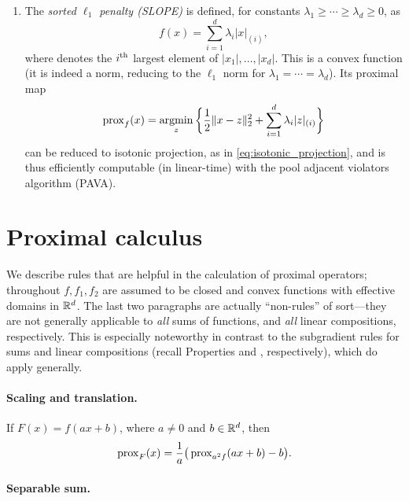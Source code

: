 \begin{Example}
\begin{enumerate}[label=\alph*., ref=\alph*]
\item {}
  The \emph{sorted $\ell_1$ penalty (SLOPE)} is defined, for constants
  $\lambda_1 \geq \cdots \geq \lambda_d \geq 0$, as 
  \begin{equation}
  \label{eq:slope}
  f(x) = \sum_{i=1}^d \lambda_i |x|_{(i)},
  \end{equation}
  where  denotes the $i^{\textnormal{th}}$ largest element of $|x_1|,
  \dots, |x_d|$. This is a convex function (it is indeed a norm, reducing to
  the $\ell_1$ norm for $\lambda_1 = \cdots = \lambda_d$). Its proximal map   
  \[
  \operatorname{prox}_f(x) = \operatorname*{argmin}_z \bigg\{ \frac{1}{2} \|x - z\|_2^2 +
  \sum_{i=1}^d \lambda_i |z|_{(i)} \bigg\}
  \]
  can be reduced to isotonic projection, as in \eqref{eq:isotonic_projection},
  and is thus efficiently computable (in linear-time) with the pool adjacent
  violators algorithm (PAVA). 
\end{enumerate}
\end{Example}

\section{Proximal calculus}

We describe rules that are helpful in the calculation of proximal operators; 
throughout $f,f_1,f_2$ are assumed to be closed and convex functions with
effective domains in $\mathbb{R}^d$. The last two paragraphs are actually ``non-rules''
of sort---they are not generally applicable to \emph{all} sums of functions, 
and \emph{all} linear compositions, respectively. This is especially noteworthy
in contrast to the subgradient rules for sums and linear compositions (recall
Properties  and , 
respectively), which do apply generally. 

\paragraph{Scaling and translation.}

If $F(x) = f(ax + b)$, where $a \not= 0$ and $b \in \mathbb{R}^d$, then 
\[ 
\operatorname{prox}_F(x) = \frac{1}{a} \big( \operatorname{prox}_{a^2 f}(ax + b) - b \big).
\]

\paragraph{Separable sum.}

